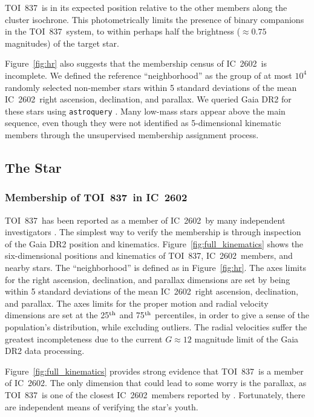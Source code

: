 \documentclass[12pt,twocolumn,tighten]{aastex63}
\newcommand{\tn}{TOI~837} %
\newcommand{\cn}{IC~2602} %
\begin{document}
\tn\ is in its expected position relative to the other members along
the cluster isochrone.  This photometrically limits the presence of
binary companions in the \tn\ system, to within perhaps half the
brightness ($\approx0.75$ magnitudes) of the target star.

Figure~\ref{fig:hr} also suggests that the membership census of \cn\
is incomplete.  We defined the reference ``neighborhood'' as the group
of at most $10^4$ randomly selected non-member stars within 5 standard
deviations of the mean \cn\ right ascension, declination, and
parallax.  We queried Gaia DR2 for these stars using
\texttt{astroquery} \citep{astroquery_2018}.  Many low-mass stars
appear above the main sequence, even though they were not identified
as 5-dimensional kinematic members through the unsupervised
\citet{cantatgaudin_gaia_2018} membership assignment process.


\subsection{The Star}
\label{subsec:star}

\subsubsection{Membership of \tn\ in \cn}
\label{subsec:member}

\tn\ has been reported as a member of \cn\ by many independent
investigators \citep[{\it
e.g.},][]{Kharchenko_et_al_2013,oh_comoving_2017,cantatgaudin_gaia_2018,damiani_stellar_2019,kounkel_untangling_2019}.
The simplest way to verify the membership is through inspection of the
Gaia DR2 position and kinematics.  Figure~\ref{fig:full_kinematics}
shows the six-dimensional positions and kinematics of \tn, \cn\
members, and nearby stars.  The ``neighborhood'' is defined as in
Figure~\ref{fig:hr}.  The axes limits for the right ascension,
declination, and parallax dimensions are set by being within 5
standard deviations of the mean \cn\ right ascension, declination, and
parallax.  The axes limits for the proper motion and radial velocity
dimensions are set at the 25$^{\rm th}$ and 75$^{\rm th}$ percentiles,
in order to give a sense of the population's distribution, while
excluding outliers.  The radial velocities suffer the greatest
incompleteness due to the current $G\approx12$ magnitude limit of the
Gaia DR2 data processing.

Figure~\ref{fig:full_kinematics} provides strong evidence that \tn\ is
a member of \cn.  The only dimension that could lead to some worry is
the parallax, as \tn\ is one of the closest \cn\ members reported by
\citet{cantatgaudin_gaia_2018}.  Fortunately, there are independent
means of verifying the star's youth.
\end{document}

